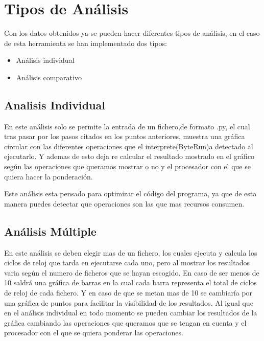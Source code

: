 \section{Tipos de Análisis}
Con los datos obtenidos ya se pueden hacer diferentes tipos de análisis, en el caso de esta herramienta se han implementado dos tipos:
\begin{itemize}
	\item Análisis individual
	\item Análisis comparativo
\end{itemize}
 

\subsection{Analisis Individual}
En este análisis solo se permite la entrada de un fichero,de formato .py, el cual tras pasar por los pasos citados en los puntos anteriores, muestra una gráfica circular con las diferentes operaciones que el interprete(ByteRun)a detectado al ejecutarlo. Y ademas de esto  deja re calcular el resultado mostrado en el gráfico según las operaciones que queramos mostrar o no y el procesador  con el que se quiera hacer la ponderación.\\



Este análisis esta pensado para optimizar el código del programa, ya que de esta manera puedes detectar que operaciones son las que mas recursos consumen.

\subsection{Análisis Múltiple}
En este análisis se deben elegir mas de un fichero, los cuales ejecuta y calcula los ciclos de reloj que tarda en ejecutarse cada uno, pero al mostrar los resultados varia según el numero  de ficheros que  se hayan escogido. En caso de ser menos de 10 saldrá una gráfica de barras en la cual cada barra representa el total de ciclos de reloj de cada fichero. Y en caso de que se metan mas de 10 se cambiaría por una  gráfica de puntos para facilitar la visibilidad de los resultados. Al igual que en el análisis  individual en todo momento se pueden cambiar los resultados  de la gráfica cambiando las operaciones que queramos que se tengan en cuenta y el procesador  con el que se quiera ponderar las operaciones.\\

